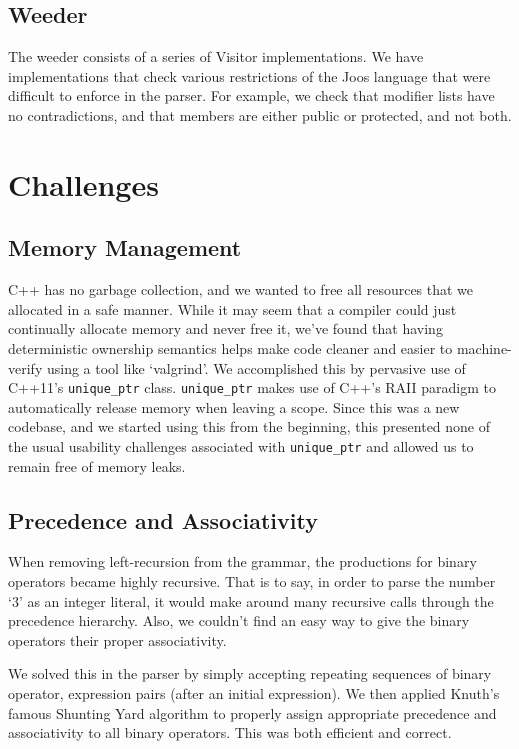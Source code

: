 \documentclass[12pt, titlepage]{article}
\begin{document}
\subsection{Weeder}
The weeder consists of a series of Visitor implementations. We have
implementations that check various restrictions of the Joos language that were
difficult to enforce in the parser. For example, we check that modifier lists
have no contradictions, and that members are either public or protected, and
not both.

\section{Challenges}
\subsection{Memory Management}
C++ has no garbage collection, and we wanted to free all resources that we
allocated in a safe manner. While it may seem that a compiler could just
continually allocate memory and never free it, we've found that having
deterministic ownership semantics helps make code cleaner and easier to
machine-verify using a tool like `valgrind'. We accomplished this by pervasive
use of C++11's \verb+unique_ptr+ class. \verb+unique_ptr+ makes use of C++'s
RAII paradigm to automatically release memory when leaving a scope. Since this
was a new codebase, and we started using this from the beginning, this
presented none of the usual usability challenges associated with
\verb+unique_ptr+ and allowed us to remain free of memory leaks.

\subsection{Precedence and Associativity}
When removing left-recursion from the grammar, the productions for binary
operators became highly recursive. That is to say, in order to parse the number
`3' as an integer literal, it would make around many recursive calls through
the precedence hierarchy. Also, we couldn't find an easy way to give the binary
operators their proper associativity.

We solved this in the parser by simply accepting repeating sequences of binary
operator, expression pairs (after an initial expression). We then applied
Knuth's famous Shunting Yard algorithm to properly assign appropriate
precedence and associativity to all binary operators. This was both efficient
and correct.
\end{document}
